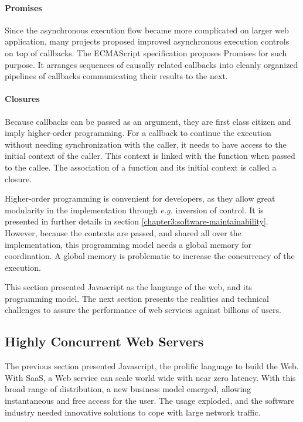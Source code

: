 \paragraph{Promises}

Since the asynchronous execution flow became more complicated on larger web application, many projects proposed improved asynchronous execution controls on top of callbacks.
The ECMAScript specification proposes Promises for such purpose.
It arranges sequences of causally related callbacks into cleanly organized pipelines of callbacks communicating their results to the next.

\paragraph{Closures}

Because callbacks can be passed as an argument, they are first class citizen and imply higher-order programming. %
For a callback to continue the execution without needing synchronization with the caller, it needs to have access to the initial context of the caller.
This context is linked with the function when passed to the callee.
The association of a function and its initial context is called a closure.

Higher-order programming is convenient for developers, as they allow great modularity in the implementation through \textit{e.g.} inversion of control.
It is presented in further details in section \ref{chapter3:software-maintainability}.
However, because the contexts are passed, and shared all over the implementation, this programming model needs a global memory for coordination.
A global memory is problematic to increase the concurrency of the execution.

This section presented Javascript as the language of the web, and its programming model.
The next section presents the realities and technical challenges to assure the performance of web services against billions of users.

\subsection{Highly Concurrent Web Servers}

The previous section presented Javascript, the prolific language to build the Web.
With SaaS, a Web service can scale world wide with near zero latency. %
With this broad range of distribution, a new business model emerged, allowing instantaneous and free access for the user.
The usage exploded, and the software industry needed innovative solutions to cope with large network traffic.

